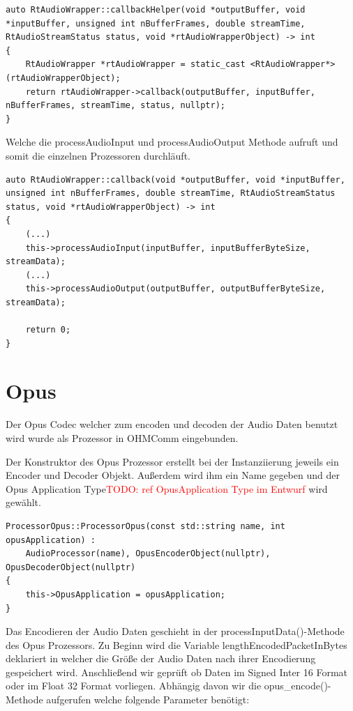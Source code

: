 \begin{lstlisting}[caption={callbackHelper Methode im RtAudioWrapper},label={Code:RtAudio}]
auto RtAudioWrapper::callbackHelper(void *outputBuffer, void *inputBuffer, unsigned int nBufferFrames, double streamTime, RtAudioStreamStatus status, void *rtAudioWrapperObject) -> int
{
    RtAudioWrapper *rtAudioWrapper = static_cast <RtAudioWrapper*> (rtAudioWrapperObject);
    return rtAudioWrapper->callback(outputBuffer, inputBuffer, nBufferFrames, streamTime, status, nullptr);
}
\end{lstlisting}

Welche die processAudioInput und processAudioOutput Methode aufruft und somit die einzelnen Prozessoren durchläuft.

\begin{lstlisting}[caption={callback Methode im RtAudioWrapper},label={Code:RtAudio}]
auto RtAudioWrapper::callback(void *outputBuffer, void *inputBuffer, unsigned int nBufferFrames, double streamTime, RtAudioStreamStatus status, void *rtAudioWrapperObject) -> int
{
	(...)
	this->processAudioInput(inputBuffer, inputBufferByteSize, streamData);
	(...)
	this->processAudioOutput(outputBuffer, outputBufferByteSize, streamData);
	
	return 0;
}
\end{lstlisting}

\section{Opus}

Der Opus Codec welcher zum encoden und decoden der Audio Daten benutzt wird wurde als Prozessor in OHMComm eingebunden.

Der Konstruktor des Opus Prozessor erstellt bei der Instanziierung jeweils ein Encoder und Decoder Objekt. Außerdem wird ihm ein Name gegeben und der Opus Application Type\textcolor{red}{TODO: ref OpusApplication Type im Entwurf} wird gewählt.

\begin{lstlisting}[caption={Instanziierung des Opus Prozessors},label={Code:Opus}]
ProcessorOpus::ProcessorOpus(const std::string name, int opusApplication) : 
    AudioProcessor(name), OpusEncoderObject(nullptr), OpusDecoderObject(nullptr)
{
    this->OpusApplication = opusApplication;
}
\end{lstlisting}

Das Encodieren der Audio Daten geschieht in der processInputData()-Methode des Opus Prozessors. Zu Beginn wird die Variable lengthEncodedPacketInBytes deklariert in welcher die Größe der Audio Daten nach ihrer Encodierung gespeichert wird. Anschließend wir geprüft ob Daten im Signed Inter 16 Format oder im Float 32 Format vorliegen.
Abhängig davon wir die opus\_encode()-Methode aufgerufen welche folgende Parameter benötigt:

